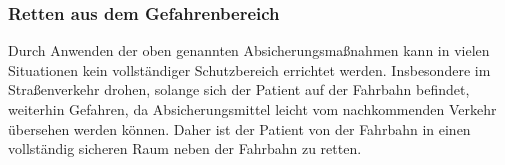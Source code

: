 % 






% 
% 
% 






\subsubsection{Retten aus dem Gefahrenbereich}

Durch Anwenden der oben genannten Absicherungsmaßnahmen kann
in vielen Situationen kein vollständiger Schutzbereich errichtet werden.
Insbesondere im Straßenverkehr drohen, solange sich der Patient auf
der Fahrbahn befindet, weiterhin Gefahren, da Absicherungsmittel leicht
vom nachkommenden Verkehr übersehen werden können. Daher
ist der Patient von der Fahrbahn in einen
vollständig sicheren Raum neben der Fahrbahn zu retten. 


